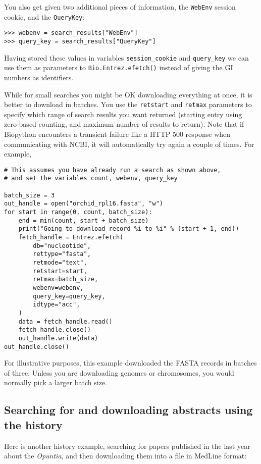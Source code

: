 \noindent You also get given two additional pieces of information, the \texttt{WebEnv} session cookie, and the \texttt{QueryKey}:

\begin{verbatim}
>>> webenv = search_results["WebEnv"]
>>> query_key = search_results["QueryKey"]
\end{verbatim}

Having stored these values in variables \texttt{session\_cookie} and \texttt{query\_key} we can use them as parameters to \verb|Bio.Entrez.efetch()| instead of giving the GI numbers as identifiers.

While for small searches you might be OK downloading everything at once, it is better to download in batches.  You use the \texttt{retstart} and \texttt{retmax} parameters to specify which range of search results you want returned (starting entry using zero-based counting, and maximum number of results to return). Note that if Biopython encounters a transient failure like a HTTP 500 response when communicating with NCBI, it will automatically try again a couple of times.
For example,

\begin{verbatim}
# This assumes you have already run a search as shown above,
# and set the variables count, webenv, query_key

batch_size = 3
out_handle = open("orchid_rpl16.fasta", "w")
for start in range(0, count, batch_size):
    end = min(count, start + batch_size)
    print("Going to download record %i to %i" % (start + 1, end))
    fetch_handle = Entrez.efetch(
        db="nucleotide",
        rettype="fasta",
        retmode="text",
        retstart=start,
        retmax=batch_size,
        webenv=webenv,
        query_key=query_key,
        idtype="acc",
    )
    data = fetch_handle.read()
    fetch_handle.close()
    out_handle.write(data)
out_handle.close()
\end{verbatim}

\noindent For illustrative purposes, this example downloaded the FASTA records in batches of three.  Unless you are downloading genomes or chromosomes, you would normally pick a larger batch size.

\subsection{Searching for and downloading abstracts using the history}
Here is another history example, searching for papers published in the last year about the \textit{Opuntia}, and then downloading them into a file in MedLine format:

